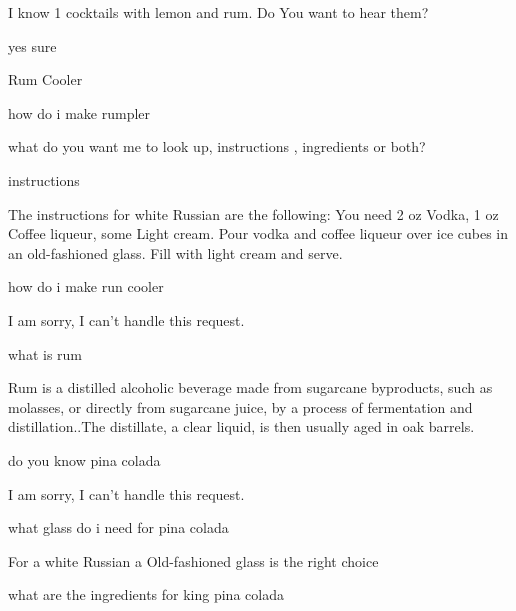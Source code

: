 \documentclass[12pt,letterpaper]{article}
\begin{document}
\begin{dialogue}
 I know 1 cocktails with lemon and rum. Do You want to hear them?

 yes sure

 Rum Cooler

 how do i make rumpler

 what do you want me to look up, instructions , ingredients or both?

 instructions

 The instructions for white Russian are the following: You need 2 oz Vodka, 1 oz Coffee liqueur, some Light cream. Pour vodka and coffee liqueur over ice cubes in an old-fashioned glass. Fill with light cream and serve.

 how do i make run cooler\\

 I am sorry, I can't handle this request.

 what is rum

 Rum is a distilled alcoholic beverage made from sugarcane byproducts, such as molasses, or directly from sugarcane juice, by a process of fermentation and distillation..The distillate, a clear liquid, is then usually aged in oak barrels.

 do you know pina colada\\

 I am sorry, I can't handle this request.

 what glass do i need for pina colada\\

 For a white Russian a Old-fashioned glass is the right choice

 what are the ingredients for king pina colada\\


\end{dialogue}
\end{document}
